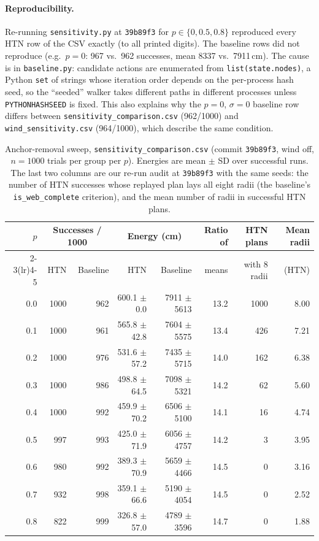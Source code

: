 \paragraph{Reproducibility.} Re-running \texttt{sensitivity.py} at \texttt{39b89f3} for $p\in\{0,0.5,0.8\}$
reproduced every HTN row of the CSV exactly (to all printed digits). The baseline rows did not reproduce
(e.g.\ $p=0$: 967 vs.\ 962 successes, mean 8337 vs.\ 7911\,cm). The cause is in \texttt{baseline.py}:
candidate actions are enumerated from \texttt{list(state.nodes)}, a Python \texttt{set} of strings whose
iteration order depends on the per-process hash seed, so the ``seeded'' walker takes different paths in
different processes unless \texttt{PYTHONHASHSEED} is fixed. This also explains why the $p=0$, $\sigma=0$
baseline row differs between \texttt{sensitivity\_comparison.csv} (962/1000) and
\texttt{wind\_sensitivity.csv} (964/1000), which describe the same condition.

\begin{table}[htbp]
\centering
\caption{Anchor-removal sweep, \texttt{sensitivity\_comparison.csv} (commit \texttt{39b89f3}, wind off,
$n=1000$ trials per group per $p$). Energies are mean $\pm$ SD over successful runs. The last two columns
are our re-run audit at \texttt{39b89f3} with the same seeds: the number of HTN successes whose replayed
plan lays all eight radii (the baseline's \texttt{is\_web\_complete} criterion), and the mean number of
radii in successful HTN plans.}
\label{tab:core-anchor}
\small
\begin{tabular}{rrrrrrrr}
\toprule
$p$ & \multicolumn{2}{c}{Successes / 1000} & \multicolumn{2}{c}{Energy (cm)} & Ratio of & HTN plans & Mean radii \\
\cmidrule(lr){2-3}\cmidrule(lr){4-5}
 & HTN & Baseline & HTN & Baseline & means & with 8 radii & (HTN) \\
\midrule
0.0 & 1000 & 962 & 600.1 $\pm$ 0.0 & 7911 $\pm$ 5613 & 13.2 & 1000 & 8.00 \\
0.1 & 1000 & 961 & 565.8 $\pm$ 42.8 & 7604 $\pm$ 5575 & 13.4 & 426 & 7.21 \\
0.2 & 1000 & 976 & 531.6 $\pm$ 57.2 & 7435 $\pm$ 5715 & 14.0 & 162 & 6.38 \\
0.3 & 1000 & 986 & 498.8 $\pm$ 64.5 & 7098 $\pm$ 5321 & 14.2 & 62 & 5.60 \\
0.4 & 1000 & 992 & 459.9 $\pm$ 70.2 & 6506 $\pm$ 5100 & 14.1 & 16 & 4.74 \\
0.5 & 997 & 993 & 425.0 $\pm$ 71.9 & 6056 $\pm$ 4757 & 14.2 & 3 & 3.95 \\
0.6 & 980 & 992 & 389.3 $\pm$ 70.9 & 5659 $\pm$ 4466 & 14.5 & 0 & 3.16 \\
0.7 & 932 & 998 & 359.1 $\pm$ 66.6 & 5190 $\pm$ 4054 & 14.5 & 0 & 2.52 \\
0.8 & 822 & 999 & 326.8 $\pm$ 57.0 & 4789 $\pm$ 3596 & 14.7 & 0 & 1.88 \\
\bottomrule
\end{tabular}
\end{table}


